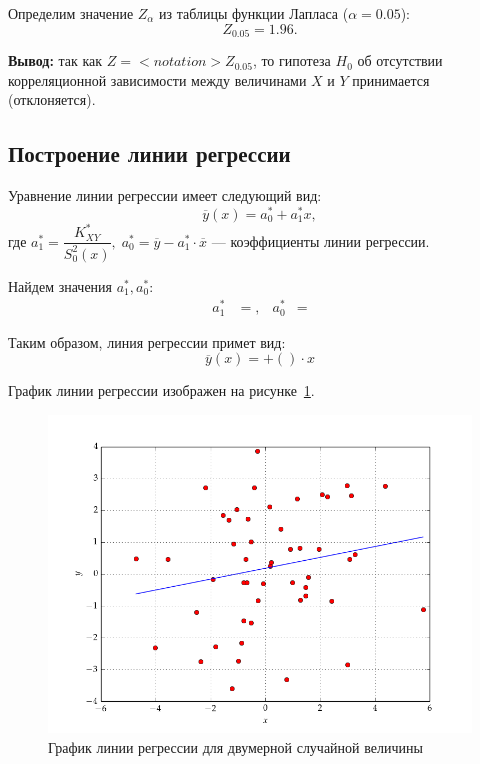 \documentclass[14pt,hidelinks]{extarticle}
\begin{document}
Определим значение $ Z_\alpha $ из таблицы функции Лапласа ($ \alpha = 0.05 $):
\begin{equation*}
  Z_{0.05} = 1.96.
\end{equation*}

\textbf{Вывод:} так как $ Z =  {<}notation{>} Z_{0.05} $,
то гипотеза $H_0$ об отсутствии корреляционной зависимости между величинами $ X $ и $ Y $ принимается (отклоняется).

\newpage

\subsection{Построение линии регрессии}

Уравнение линии регрессии имеет следующий вид:
\begin{equation}
  \overline{y}(x) = a^*_0 + a^*_1 x,
\end{equation} 
где $a^*_1 = \dfrac{K^*_{XY}}{S^2_0(x)},\; a^*_0 = \overline{y} - a^*_1 \cdot \overline{x} $
--- коэффициенты линии регрессии.

\vspace{1em}
Найдем значения $ a^*_1, a^*_0 $:
\begin{equation*}
	\begin{aligned}
		a^*_1 &= , &
		a^*_0 &= 
	\end{aligned}
\end{equation*}

Таким образом, линия регрессии примет вид:
\begin{equation}
  \overline{y}(x) = 
  + (  ) \cdot x
\end{equation}

График линии регрессии изображен на рисунке~\ref{fig:sample_regression}.
\begin{figure}[h!] 
  \centering
  \includegraphics[width=1\linewidth]{pic/sample_regression}
  \caption{График линии регрессии для двумерной случайной величины\label{fig:sample_regression}}
\end{figure}
\end{document}
